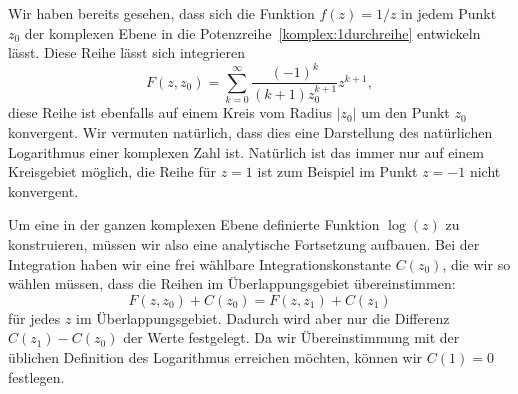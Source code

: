 \begin{beispiel}
Wir haben bereits gesehen, dass sich die Funktion $f(z)=1/z$ in jedem
Punkt $z_0$ der komplexen Ebene in die Potenzreihe~\eqref{komplex:1durchreihe}
entwickeln lässt.
Diese Reihe lässt sich integrieren
\[
F(z,z_0)
=
\sum_{k=0}^\infty\frac{(-1)^k}{(k+1)z_0^{k+1}}z^{k+1},
\]
diese Reihe ist ebenfalls auf einem Kreis vom Radius $|z_0|$ um den
Punkt $z_0$ konvergent.
Wir vermuten natürlich, dass dies eine Darstellung des natürlichen
Logarithmus einer komplexen Zahl ist.
Natürlich ist das immer nur auf einem Kreisgebiet möglich, die Reihe
für $z=1$ ist zum Beispiel im Punkt $z=-1$ nicht konvergent.

Um eine in der ganzen komplexen Ebene definierte Funktion $\log(z)$ zu
konstruieren, müssen wir also eine analytische Fortsetzung aufbauen.
Bei der Integration haben wir eine frei wählbare Integrationskonstante
$C(z_0)$, die wir so wählen müssen, dass die Reihen im Überlappungsgebiet
übereinstimmen:
\[
F(z,z_0) + C(z_0) = F(z,z_1)  + C(z_1)
\]
für jedes $z$ im Überlappungsgebiet.
Dadurch wird aber nur die Differenz $C(z_1)-C(z_0)$ der Werte festgelegt.
Da wir Übereinstimmung mit der üblichen Definition des Logarithmus
erreichen möchten, können wir $C(1)=0$ festlegen.


\end{beispiel}
